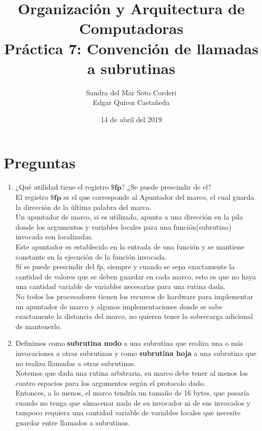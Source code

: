 \documentclass{article}
\begin{document}
    \title{
        Organización y Arquitectura de Computadoras \\
        Práctica 7: Convención de llamadas a subrutinas \\
    }
    \date{
        14 de abril del 2019
    }
    \author{
        Sandra del Mar Soto Corderi \\
        Edgar Quiroz Castañeda
    }
    \maketitle

    \section{Preguntas}
    \begin{enumerate}
    
    \item {
    ¿Qué utilidad tiene el registro $\textbf{\$fp}$? ¿Se puede prescindir de el?\\
	El registro $\textbf{\$fp}$ es el que corresponde al Apuntador del marco, 
	el cual guarda la dirección de la última palabra del marco. \\
	Un apuntador de marco, si es utilizado, apunta a una dirección en la pila 
	donde los argumentos y variables locales para una función(subrutina) 
	invocada son localizadas. \\
	Este apuntador es establecido en la entrada de una función y se mantiene 
	constante en la ejecución de la función invocada.\\
	Sí se puede prescindir del fp, siempre y cuando se sepa exactamente la
	cantidad de valores que se deben guardar en cada marco, esto es que no haya
	una cantidad variable de variables necesarias para una rutina dada. \\
	No todos los procesadores tienen los recursos de hardware para implementar 
	un apuntador de marco y algunas implementaciones donde se sabe exactamente 
	la distancia del marco, no quieren tener la sobrecarga adicional de 
	mantenerlo.
	}
	\item {
	Definimos como \textbf{subrutina nodo} a una subrutina que realiza una o más
	invocaciones a otras subrutinas y como \textbf{subrutina hoja} a una subrutina
	que no realiza llamadas a otras subrutinas. \\
	Notemos que dada una rutina arbitraria, su marco debe tener al menos los
	cuatro espacios para los argumentos según el protocolo dado.\\
	Entonces, a lo menos, el marco tendría un tamaño de 16 bytes, que pasaría
	cuando no tenga que almacenar nada de su invocador ni de sus invocados y
	tampoco requiera una cantidad variable de variables locales que necesite
	guardar entre llamados a subrutinas.
	
}
\end{enumerate}
\end{document}
